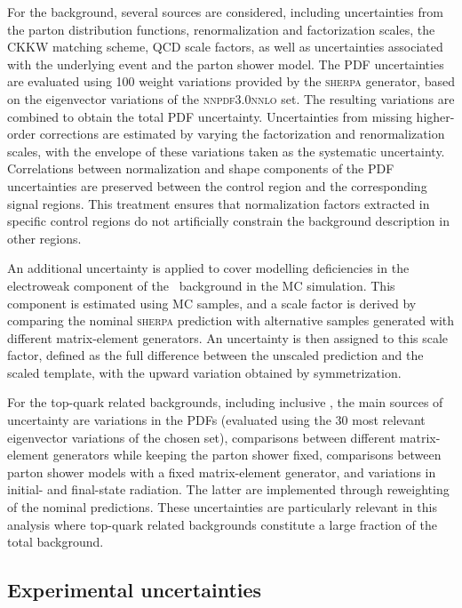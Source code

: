 For the \ztautau background, several sources are considered, including uncertainties from the parton distribution functions, renormalization and factorization scales, the CKKW matching scheme, QCD scale factors, as well as uncertainties associated with the underlying event and the parton shower model. The PDF uncertainties are evaluated using 100 weight variations provided by the \textsc{sherpa} generator, based on the eigenvector variations of the \textsc{nnpdf3.0nnlo} set. The resulting variations are combined to obtain the total PDF uncertainty. Uncertainties from missing higher-order corrections are estimated by varying the factorization and renormalization scales, with the envelope of these variations taken as the systematic uncertainty. 
Correlations between normalization and shape components of the PDF uncertainties are preserved between the \ztautau control region and the corresponding signal regions. This treatment ensures that normalization factors extracted in specific control regions do not artificially constrain the background description in other regions.  

An additional uncertainty is applied to cover modelling deficiencies in the electroweak component of the \ztautau\ background in the MC simulation. This component is estimated using MC samples, and a scale factor is derived by comparing the nominal \textsc{sherpa} prediction with alternative samples generated with different matrix-element generators. An uncertainty is then assigned to this scale factor, defined as the full difference between the unscaled prediction and the scaled template, with the upward variation obtained by symmetrization.  

For the top-quark related backgrounds, including inclusive \ttbar, the main sources of uncertainty are variations in the PDFs (evaluated using the 30 most relevant eigenvector variations of the chosen set), comparisons between different matrix-element generators while keeping the parton shower fixed, comparisons between parton shower models with a fixed matrix-element generator, and variations in initial- and final-state radiation. The latter are implemented through reweighting of the nominal predictions. These uncertainties are particularly relevant in this analysis where top-quark related backgrounds constitute a large fraction of the total background.

\subsection{Experimental uncertainties}
\label{subsec:exp_syst}

